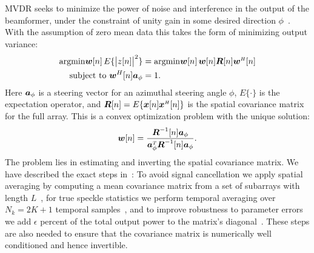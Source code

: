 MVDR seeks to minimize the power of noise and interference in the output of the beamformer, under the constraint of unity gain in some desired direction $\phi$~\cite{Capon1969}. With the assumption of zero mean data this takes the form of minimizing output variance: 
%
\begin{align}
\argmin{\w[n]}\, E\{\big|z[n]\big|^2\} &= \argmin{\w[n]}\, \w[n]\R[n]\w\H[n]\nn
\text{subject to } \w^H[n]\a_\phi &= 1.\label{III_eq:mvdr_definition}
\end{align}
%
Here $\boldsymbol{a}_\phi$ is a steering vector for an azimuthal steering angle $\phi$, $E\{\cdot\}$ is the expectation operator, and $\boldsymbol{R}[n] = E\{\boldsymbol{x}[n]\boldsymbol{x}^{\scriptscriptstyle H}[n]\}$ is the spatial covariance matrix for the full array. This is a convex optimization problem with the unique solution:
%
\begin{gather}
\vec w[n] = \frac{\Ri[n]\a_\phi}{\a_\phi\T\Ri[n]\a_\phi}.\label{III_eq:mvdr_weights}
\end{gather}
The problem lies in estimating and inverting the spatial covariance matrix. We have described the exact steps in~\cite{Buskenes2014}: To avoid signal cancellation we apply spatial averaging by computing a mean covariance matrix from a set of subarrays with length $L$~\cite{Kailath1985}, for true speckle statistics we perform temporal averaging over $N_k = 2K+1$ temporal samples~\cite{Synnevag2009a}, and to improve robustness to parameter errors we add {\large$\epsilon$} percent of the total output power to the matrix's diagonal~\cite{Cox1987,Maksym1979}. These steps are also needed to ensure that the covariance matrix is numerically well conditioned and hence invertible.

